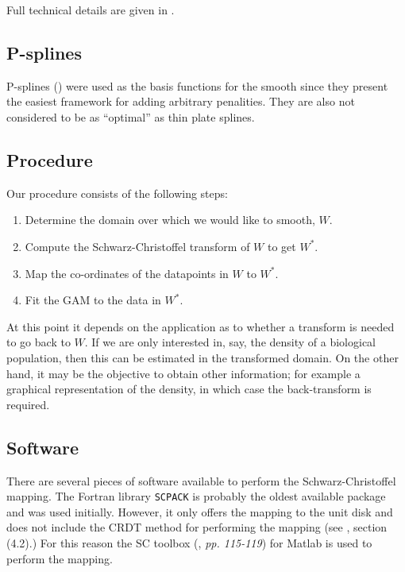 \documentclass[a4paper,10pt]{amsart}
\newcommand{\sch}{Schwarz-Christoffel }
\begin{document}
Full technical details are given in \cite{miller08}.


\subsection{P-splines}
P-splines (\cite{eilersmarx96}) were used as the basis functions for the smooth since they present the easiest framework for adding arbitrary penalities. They are also not considered to be as ``optimal'' as thin plate splines.




\subsection{Procedure}

Our procedure consists of the following steps:

\begin{enumerate}
\item Determine the domain over which we would like to smooth, $W$.

\item Compute the \sch transform of $W$ to get $W^*$.

\item Map the co-ordinates of the datapoints in $W$ to $W^*$.

\item Fit the GAM to the data in $W^*$.

\end{enumerate}

At this point it depends on the application as to whether a transform is needed to go back to $W$. If we are only interested in, say, the density of a biological population, then this can be estimated in the transformed domain. On the other hand, it may be the objective to obtain other information; for example a graphical representation of the density, in which case the back-transform is required.



\subsection{Software}

There are several pieces of software available to perform the \sch mapping. The Fortran library \texttt{SCPACK} is probably the oldest available package and was used initially. However, it only offers the mapping to the unit disk and does not include the CRDT method for performing the mapping (see \cite{miller08}, section (4.2).) For this reason the SC toolbox (\cite{driscoll}, \emph{pp. 115-119}) for Matlab is used to perform the mapping. 
\end{document}
